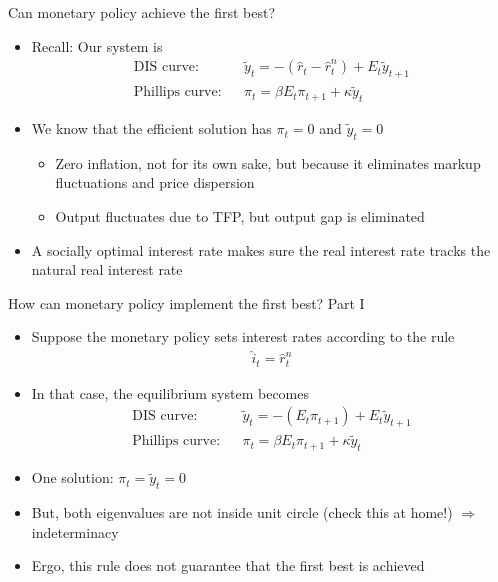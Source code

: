 \documentclass[9pt,xcolor={dvipsnames}]{beamer}
\newcommand{\bit}{\begin{itemize}}
\newcommand{\eit}{\end{itemize}}
\begin{document}
\begin{frame}{Can monetary policy achieve the first best?}

\bit
\setlength\itemsep{1.5em}

\item Recall: Our system is
\begin{eqnarray}
\text{DIS curve:} && \tilde y_t = - (\hat r_t-\hat r^n_t) + E_t \tilde y_{t+1}  \nonumber \\
\text{Phillips curve:} && \pi_t = \beta E_t \pi_{t+1} + \kappa \tilde y_t \nonumber 
\end{eqnarray}

\item We know that the efficient solution has $\pi_t = 0$ and $\tilde y_t = 0$
\bit
\setlength\itemsep{0.5em}
\item Zero inflation, not for its own sake, but because it eliminates markup fluctuations and price dispersion

\item Output fluctuates due to TFP, but output gap is eliminated
\eit

\item A socially optimal interest rate makes sure the real interest rate tracks the natural real interest rate

\eit

\end{frame}

\begin{frame}{How can monetary policy implement the first best? Part I}

\bit
\setlength\itemsep{1.5em}
\item Suppose the monetary policy sets interest rates according to the rule
\begin{eqnarray}
\hat i_t = \hat r^n_t \nonumber
\end{eqnarray}

\item In that case, the equilibrium system becomes
\begin{eqnarray}
\text{DIS curve:} && \tilde y_t = -( E_t \pi_{t+1}) + E_t \tilde y_{t+1}  \nonumber \\
\text{Phillips curve:} && \pi_t = \beta E_t \pi_{t+1} + \kappa \tilde y_t \nonumber 
\end{eqnarray}

\item One solution: $\pi_t = \tilde y_t=0$

\item But, both eigenvalues are not inside unit circle (check this at home!) $\Rightarrow$ indeterminacy

\item Ergo, this rule does not guarantee that the first best is achieved
\eit

\end{frame}
\end{document}
